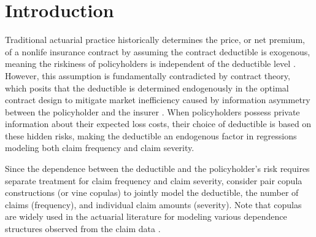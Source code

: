 \documentclass[11pt]{article}
\begin{document}
\newpage
\section{Introduction}

Traditional actuarial practice historically determines the price, or net premium, of a nonlife insurance contract by assuming the contract deductible is exogenous, meaning the riskiness of policyholders is independent of the deductible level \citep{Klugman2012}. However, this assumption is fundamentally contradicted by contract theory, which posits that the deductible is determined endogenously in the optimal contract design to mitigate market inefficiency caused by information asymmetry between the policyholder and the insurer \citep{Bolton2005contract}. When policyholders possess private information about their expected loss costs, their choice of deductible is based on these hidden risks, making the deductible an endogenous factor in regressions modeling both claim frequency and claim severity. %

 
Since the dependence between the deductible and the policyholder's risk requires separate treatment for claim frequency and claim severity, \citet{shi2022copula} consider pair copula constructions (or vine copulas) to jointly model the deductible, the number of claims (frequency), and individual claim amounts (severity). Note that copulas are widely used in the actuarial literature for modeling various dependence structures observed from the claim data \citep{FreesValdez1998, ShiLu2018, jeong2023multivariate}.
\end{document}

